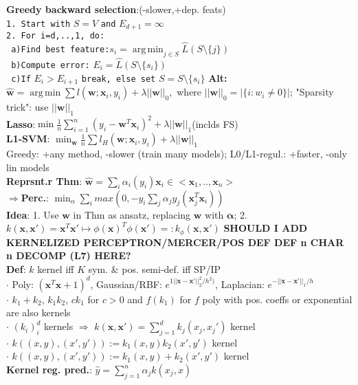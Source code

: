 \documentclass[11pt]{article}
\newcommand{\bv}[1]{\mathbf{#1}}
\newcommand{\est}[1]{\mathbf{\hat{#1}}}
\DeclareMathOperator*{\argmin}{arg\,min}
\begin{document}
\begin{multicols}{4}
\textbf{Greedy backward selection}:(-slower,+dep. feats)\\
\verb|1. Start with| $S=V$ \verb|and| $E_{d+1}=\infty$\\
\verb|2. For i=d,..,1, do:|\\
\verb| a)Find best feature:|$s_i=\argmin_{j\in S}\hat{L}(S\setminus\{j\})$\\
\verb| b)Compute error:| $E_i=\hat{L}(S\setminus \{s_i\})$\\
\verb| c)If| $E_i>E_{i+1}$ \verb|break, else set| $S=S\setminus\{s_i\}$
\textbf{Alt:} $\est{w}=\argmin\sum l(\bv{w};\bv{x}_i,y_i)+\lambda ||\bv{w}||_0,$ where $||\bv{w}||_0=|\{i:w_i\neq0\}|$; "Sparsity trick": use $||\bv{w}||_1$\\
\textbf{Lasso}:$\min\frac{1}{n}\sum^n_{i=1} (y_i-\bv{w}^T\bv{x}_i)^2+\lambda ||\bv{w}||_1$(inclds FS)\\
\textbf{L1-SVM}: $\min_\bv{w}\frac{1}{n}\sum l_H(\bv{w};\bv{x}_i,y_i)+\lambda||\bv{w}||_1$\\
Greedy: +any method, -slower (train many models); L0/L1-regul.: +faster, -only lin models\\
\textbf{Reprsnt.r Thm}: $\est{w}=\sum_i\alpha_i(y_i)\bv{x}_i\in <\bv{x}_1,..,\bv{x}_n>$\\
$\Rightarrow$\textbf{Perc.}: $\min_\alpha\sum_i max(0,-y_i\sum_j\alpha_j y_j(\bv{x}_j^T\bv{x}_i))$\\
\textbf{Idea}: 1. Use $\bv{w}$ in Thm as ansatz, replacing $\bv{w}$ with $\bv{\alpha}$; 2. $k(\bv{x},\bv{x}')=\bv{x}^T\bv{x}'\mapsto\phi(\bv{x})^T\phi(\bv{x}')=:k_\phi(\bv{x},\bv{x}')$
\textbf{SHOULD I ADD KERNELIZED PERCEPTRON/MERCER/POS DEF DEF n CHAR n DECOMP (L7) HERE?}\\
\textbf{Def}: $k$ kernel iff $K$ sym. \& pos. semi-def. iff SP/IP\\
$\cdot$ Poly: $(\bv{x}^T\bv{x}+1)^d$, Gaussian/RBF: $e^{1||\bv{x}-\bv{x}'||^2_2/h^2)}$, Laplacian: $e^{-||\bv{x}-\bv{x}'||_1/h}$\\
$\cdot$ $k_1+k_2$, $k_1 k_2$, $ck_1$ for $c>0$ and $f(k_1)$ for $f$ poly with pos. coeffs or exponential are also kernels\\
$\cdot$ $(k_i)^d_i$ kernels $\Rightarrow$ $k(\bv{x},\bv{x}')=\sum^d_{j=1} k_j(x_j,x_j')$ kernel\\
$\cdot$ $k((x,y),(x',y')):= k_1(x,y)k_2(x',y')$ kernel\\
$\cdot$ $k((x,y),(x',y')):=k_1(x,y)+k_2(x',y')$ kernel\\
\textbf{Kernel reg. pred.}: $\hat{y}=\sum^n_{j=1}\alpha_j k(x_j,x)$\\

\end{multicols}
\end{document}

